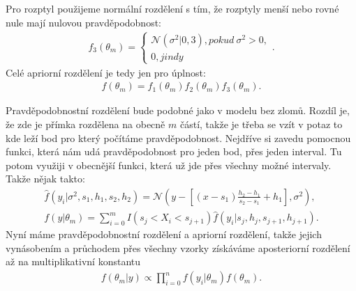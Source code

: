 \documentclass[czech,master,public,dept470,male,cpdeclaration,oneside, python]{diploma}
\begin{document}
Pro rozptyl použijeme normální rozdělení s tím, že rozptyly menší nebo rovné nule mají nulovou pravděpodobnost:
\begin{align}
f_3(\theta_m) = 
\begin{cases}
\mathcal{N}(\sigma^2 | 0, 3), pokud\  \sigma^2 > 0, \\
0, jindy
\end{cases}.
\end{align}
Celé apriorní rozdělení je tedy jen pro úplnost:
\begin{align}
f(\theta_m) = f_1(\theta_m)f_2(\theta_m)f_3(\theta_m).
\end{align} \par
Pravděpodobnostní rozdělení bude podobné jako v modelu bez zlomů. Rozdíl je, že zde je přímka rozdělena na obecně $m$ částí, takže je třeba se vzít v potaz to kde leží bod pro který počítáme pravděpodobnost. Nejdříve si zavedu pomocnou funkci, která nám udá pravděpodobnost pro jeden bod, přes jeden interval. Tu potom využiji v obecnější funkci, která už jde přes všechny možné intervaly. Takže nějak takto:
\begin{align}
\hat{f}(y_i | \sigma^2, s_1, h_1, s_2, h_2) = \mathcal{N}(y - [(x - s_1)\frac{h_2 - h_1}{s_2 - s_1} + h_1], \sigma^2), \\
f(y | \theta_m) = \sum_{i=0}^{m} I(s_j < X_i < s_{j+1}) 
\hat{f}(y_i | s_j, h_j, s_{j+1}, h_{j+1}).
\end{align}
Nyní máme pravděpodobnostní rozdělení a apriorní rozdělení, takže jejich vynásobením a průchodem přes všechny vzorky získáváme aposteriorní rozdělení až na multiplikativní konstantu
\begin{align}
f(\theta_m | y) \propto \prod_{i=0}^{n} f(y_i | \theta_m) f(\theta_m).
\end{align}
\end{document}
